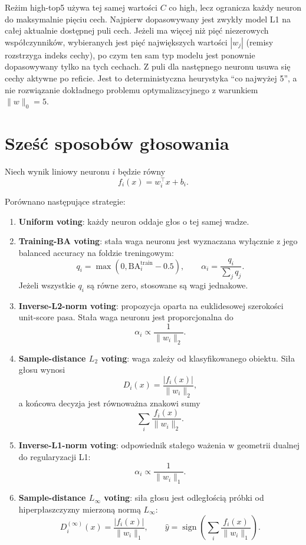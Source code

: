 \documentclass[11pt,a4paper]{article}
\begin{document}
Reżim high-top5 używa tej samej wartości $C$ co high, lecz ogranicza każdy neuron do maksymalnie pięciu cech.
Najpierw dopasowywany jest zwykły model L1 na całej aktualnie dostępnej puli cech. Jeżeli ma więcej niż pięć
niezerowych współczynników, wybieranych jest pięć największych wartości $|w_j|$ (remisy rozstrzyga indeks
cechy), po czym ten sam typ modelu jest ponownie dopasowywany tylko na tych cechach. Z puli dla następnego
neuronu usuwa się cechy aktywne po reficie. Jest to deterministyczna heurystyka ``co najwyżej 5'', a nie
rozwiązanie dokładnego problemu optymalizacyjnego z warunkiem $\lVert w\rVert_0=5$.

\section{Sześć sposobów głosowania}

Niech wynik liniowy neuronu $i$ będzie równy
\[
f_i(x)=w_i^\top x+b_i.
\]

Porównano następujące strategie:

\begin{enumerate}
\item \textbf{Uniform voting}: każdy neuron oddaje głos o tej samej wadze.

\item \textbf{Training-BA voting}: stała waga neuronu jest wyznaczana wyłącznie z jego balanced accuracy
na foldzie treningowym:
\[
q_i=\max(0,\mathrm{BA}^{\mathrm{train}}_i-0.5),
\qquad
\alpha_i=\frac{q_i}{\sum_jq_j}.
\]
Jeżeli wszystkie $q_i$ są równe zero, stosowane są wagi jednakowe.

\item \textbf{Inverse-L2-norm voting}: propozycja oparta na euklidesowej szerokości unit-score pasa. Stała waga neuronu
jest proporcjonalna do
\[
\alpha_i\propto\frac{1}{\lVert w_i\rVert_2}.
\]

\item \textbf{Sample-distance $L_2$ voting}: waga zależy od klasyfikowanego obiektu. Siła głosu wynosi
\[
D_i(x)=\frac{|f_i(x)|}{\lVert w_i\rVert_2},
\]
a końcowa decyzja jest równoważna znakowi sumy
\[
\sum_i\frac{f_i(x)}{\lVert w_i\rVert_2}.
\]

\item \textbf{Inverse-L1-norm voting}: odpowiednik stałego ważenia w geometrii dualnej do regularyzacji L1:
\[
\alpha_i\propto\frac{1}{\lVert w_i\rVert_1}.
\]

\item \textbf{Sample-distance $L_\infty$ voting}: siła głosu jest odległością próbki od hiperpłaszczyzny
mierzoną normą $L_\infty$:
\[
D_i^{(\infty)}(x)=\frac{|f_i(x)|}{\lVert w_i\rVert_1},
\qquad
\widehat y=\operatorname{sign}\!\left(\sum_i\frac{f_i(x)}{\lVert w_i\rVert_1}\right).
\]
\end{enumerate}
\end{document}
